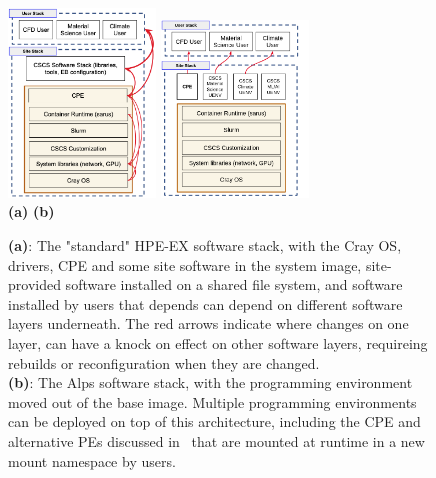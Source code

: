 \begin{figure}[htp!]
    \begin{center}
        \includegraphics[width=0.35\textwidth]{./images/stack-old.png}
        \hspace{2.5cm}
        \includegraphics[width=0.35\textwidth]{./images/stack-new.png}
        \\
        \textbf{(a)} \hspace{9cm} \textbf{(b)}\\
    \end{center}
    \caption{
        \textbf{(a)}:
        The "standard" HPE-EX software stack, with the Cray OS, drivers, CPE and some site software in the system image, site-provided software installed on a shared file system, and software installed by users that depends can depend on different software layers underneath.
        The red arrows indicate where changes on one layer, can have a knock on effect on other software layers, requireing rebuilds or reconfiguration when they are changed.\\
        \textbf{(b)}:
        The Alps software stack, with the programming environment moved out of the base image.
        Multiple programming environments can be deployed on top of this architecture, including the CPE and alternative PEs discussed in~ that are mounted at runtime in a new mount namespace by users.
    }
    \label{fig:stacks}
\end{figure}

